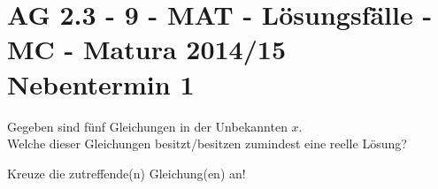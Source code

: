 \section{AG 2.3 - 9 - MAT - Lösungsfälle - MC - Matura 2014/15 Nebentermin 1}

\begin{beispiel}[AG 2.3]{1} %
				Gegeben sind fünf Gleichungen in der Unbekannten $x$.\\
				
				Welche dieser Gleichungen besitzt/besitzen zumindest eine reelle Lösung?
				
				Kreuze die zutreffende(n) Gleichung(en) an!
				
\end{beispiel}
